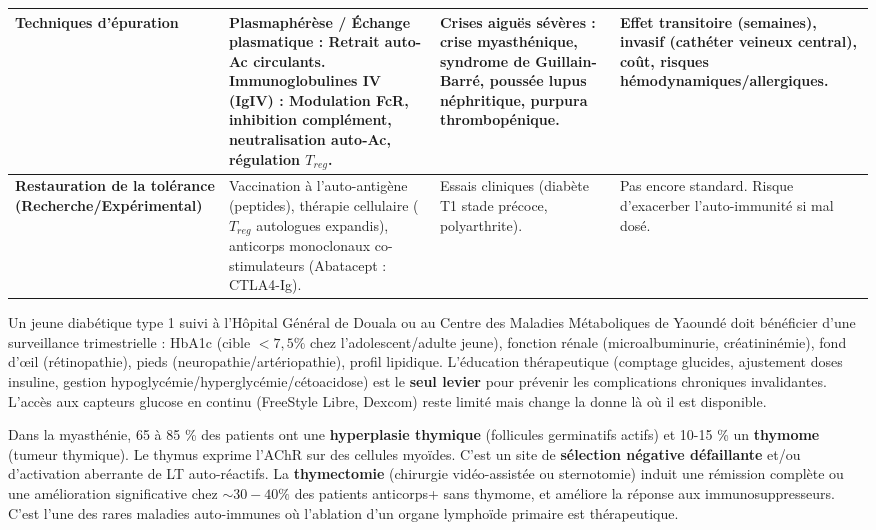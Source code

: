 \documentclass[11pt]{article}
\begin{document}
\begin{propriete}
\begin{center}
\begin{tabularx}{\linewidth}{|l|X|X|X|}
\textbf{Techniques d'épuration} & \textbf{Plasmaphérèse / Échange plasmatique :} Retrait auto-Ac circulants. \newline \textbf{Immunoglobulines IV (IgIV) :} Modulation FcR, inhibition complément, neutralisation auto-Ac, régulation $T_{reg}$. & Crises aiguës sévères : crise myasthénique, syndrome de Guillain-Barré, poussée lupus néphritique, purpura thrombopénique. & Effet transitoire (semaines), invasif (cathéter veineux central), coût, risques hémodynamiques/allergiques. \\ \hline
\textbf{Restauration de la tolérance (Recherche/Expérimental)} & Vaccination à l'auto-antigène (peptides), thérapie cellulaire ($T_{reg}$ autologues expandis), anticorps monoclonaux co-stimulateurs (Abatacept : CTLA4-Ig). & Essais cliniques (diabète T1 stade précoce, polyarthrite). & Pas encore standard. Risque d'exacerber l'auto-immunité si mal dosé. \\ \hline
\end{tabularx}
\end{center}
\end{propriete}

\begin{attention}
Un jeune diabétique type 1 suivi à l'Hôpital Général de Douala ou au Centre des Maladies Métaboliques de Yaoundé doit bénéficier d'une surveillance trimestrielle : HbA1c (cible $< 7,5\%$ chez l'adolescent/adulte jeune), fonction rénale (microalbuminurie, créatininémie), fond d'œil (rétinopathie), pieds (neuropathie/artériopathie), profil lipidique. L'éducation thérapeutique (comptage glucides, ajustement doses insuline, gestion hypoglycémie/hyperglycémie/cétoacidose) est le \textbf{seul levier} pour prévenir les complications chroniques invalidantes. L'accès aux capteurs glucose en continu (FreeStyle Libre, Dexcom) reste limité mais change la donne là où il est disponible.
\end{attention}

\begin{savaistu}
Dans la myasthénie, 65 à 85 \% des patients ont une \textbf{hyperplasie thymique} (follicules germinatifs actifs) et 10-15 \% un \textbf{thymome} (tumeur thymique). Le thymus exprime l'AChR sur des cellules myoïdes. C'est un site de \textbf{sélection négative défaillante} et/ou d'activation aberrante de LT auto-réactifs. La \textbf{thymectomie} (chirurgie vidéo-assistée ou sternotomie) induit une rémission complète ou une amélioration significative chez $\sim 30-40\%$ des patients anticorps+ sans thymome, et améliore la réponse aux immunosuppresseurs. C'est l'une des rares maladies auto-immunes où l'ablation d'un organe lymphoïde primaire est thérapeutique.
\end{savaistu}
\end{document}

